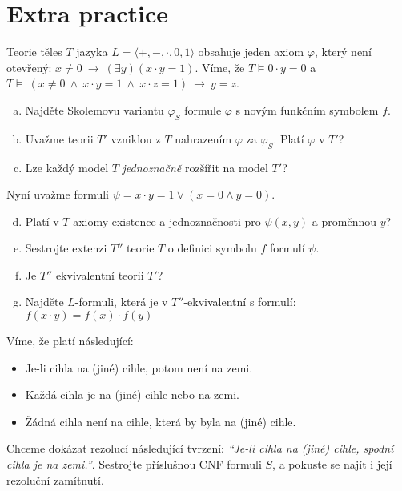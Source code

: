         
\section*{Extra practice}


\begin{problem}

    Teorie těles $T$ jazyka $L=\langle +,-,\cdot,0,1\rangle$ obsahuje jeden axiom $\varphi$, který není otevřený: $x\neq 0\ \to\ (\exists y)(x\cdot y=1)$. Víme, že $T\models 0\cdot y=0$ a $T\models\ (x\ne 0\ \wedge\ x\cdot y=1\ \wedge\ x\cdot z=1)\ \to\ y=z$.
    \begin{enumerate}[(a)]
        \item Najděte Skolemovu variantu $\varphi_S$ formule $\varphi$ s novým funkčním symbolem $f$.
        \item Uvažme teorii $T'$ vzniklou z $T$ nahrazením $\varphi$ za $\varphi_S$. Platí $\varphi$ v $T'$?
        \item Lze každý model $T$ \emph{jednoznačně} rozšířit na model $T'$?
    \end{enumerate}
    Nyní uvažme formuli $\psi=x\cdot y=1\vee  (x=0 \wedge y=0)$.
    \begin{enumerate}[(a)]
        \setcounter{enumi}{3}
        \item Platí v $T$ axiomy existence a jednoznačnosti pro $\psi(x,y)$ a proměnnou $y$?
        \item Sestrojte extenzi $T''$ teorie $T$ o definici symbolu $f$ formulí $\psi$.
        \item Je $T''$ ekvivalentní teorii $T'$?
        \item Najděte $L$-formuli, která je v $T''$-ekvivalentní s formulí:
        $f(x\cdot y)=f(x)\cdot f(y)$
    \end{enumerate}

\end{problem}


\medskip\begin{problem} Víme, že platí následující:
    \begin{itemize}\it
        \item Je-li cihla na (jiné) cihle, potom není na zemi.
        \item Každá cihla je na (jiné) cihle nebo na zemi.
        \item Žádná cihla není na cihle, která by byla na (jiné) cihle.
    \end{itemize}
    Chceme dokázat rezolucí následující tvrzení: {\it ``Je-li cihla na (jiné) cihle, spodní cihla je na zemi.''}. Sestrojte příslušnou CNF formuli $S$, a pokuste se najít i její rezoluční zamítnutí.
\end{problem}

